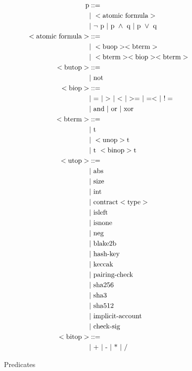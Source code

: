 \documentclass[runningheads]{llncs}
\begin{document}
\pagebreak
\begin{figure}
\begin{align*}
\text{p} &::= \\
   &\text{$\mid$}\ < \text{atomic formula} > \\
   &\text{$\mid$}\ \neg\ \text{p} \
   \text{$\mid$}\ \text{p}\ \wedge\ \text{q} \
   \text{$\mid$}\ \text{p}\ \vee\ \text{q} \\
< \text{atomic formula} > &::= \\ 
    &\text{$\mid$}\ < \text{buop} > < \text{bterm} >\\ 
   &\text{$\mid$}\  < \text{bterm} >  < \text{biop} > < \text{bterm} >\\ 
< \text{butop} > &::= \\
   &\text{$\mid$}\ \text{not} \\
< \text{biop} > &::= \\
   &\text{$\mid$}\ \text{$=$} \
   \text{$\mid$}\ \text{$>$} \
   \text{$\mid$}\ \text{$<$} \
   \text{$\mid$}\ \text{$>=$} \
   \text{$\mid$}\ \text{$=<$} \
   \text{$\mid$}\ \text{$!=$} \\
   &\text{$\mid$}\ \text{and}\ \text{$\mid$}\ \text{or}\ \text{$\mid$}\ \text{xor}\\
< \text{bterm} > &::= \\ 
   &\text{$\mid$}\ \text{t} \\
   &\text{$\mid$}\ < \text{unop} > \text{t} \\ 
   &\text{$\mid$}\ \text{t}\ < \text{binop} > \text{t}\\  
< \text{utop} > &::= \\ 
   &\text{$\mid$}\ \text{abs} \\
   &\text{$\mid$}\ \text{size} \\
   &\text{$\mid$}\ \text{int} \\
   &\text{$\mid$}\ \text{contract}  < \text{type} > \\
   &\text{$\mid$}\ \text{isleft} \\
   &\text{$\mid$}\ \text{isnone} \\
   &\text{$\mid$}\ \text{neg} \\
   &\text{$\mid$}\ \text{blake2b} \\
   &\text{$\mid$}\ \text{hash-key} \\
   &\text{$\mid$}\ \text{keccak} \\
   &\text{$\mid$}\ \text{pairing-check} \\
   &\text{$\mid$}\ \text{sha256} \\
   &\text{$\mid$}\ \text{sha3} \\
   &\text{$\mid$}\ \text{sha512} \\
   &\text{$\mid$}\ \text{implicit-account} \\
   &\text{$\mid$}\ \text{check-sig} \\
< \text{bitop} > &::= \\ 
   &\text{$\mid$}\ \text{+}\ \text{$\mid$}\ \text{-}\ \text{$\mid$}\ \text{*}\ \text{$\mid$}\ \text{/}
\end{align*}
\caption{Predicates}
\label{fig:predicate}
\end{figure}
\end{document}
